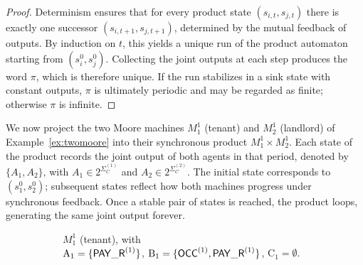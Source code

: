 \documentclass{article}
\begin{document}
  \begin{proof}
  Determinism ensures that for every product state $(s_{i,t},s_{j,t})$ there is exactly one
  successor $(s_{i,t+1},s_{j,t+1})$, determined by the mutual feedback of outputs.
  By induction on $t$, this yields a unique run of the product automaton starting from $(s^0_i,s^0_j)$.
  Collecting the joint outputs at each step produces the word $\pi$, which is therefore unique.
  If the run stabilizes in a sink state with constant outputs, $\pi$ is ultimately periodic
  and may be regarded as finite; otherwise $\pi$ is infinite.
  \end{proof}
  
  \begin{example}
  \label{ex:product-automaton}
  We now project the two Moore machines $M_1^1$ (tenant) and $M_2^1$ (landlord) of
  Example~\ref{ex:twomoore} into their synchronous product $M_1^1 \times M_2^1$.
  Each state of the product records the joint output of both agents in that period, denoted by $\{A_1,A_2\}$, with $A_1\in 2^{\Sigma_C^{(1)}}$ and $A_2\in 2^{\Sigma_C^{(2)}}$.
  The initial state corresponds to $(s^0_1,s^0_2)$; subsequent states reflect how both machines
  progress under synchronous feedback. Once a stable pair of states is reached, the product
  loops, generating the same joint output forever.
  
  \begin{figure}[h]
  \centering
  \begin{subfigure}[t]{0.70\textwidth}
  \centering
  \caption{$M_1^1$ (tenant), with\\ $\mathrm{A_1}=\{\mathsf{PAY\_R}^{(1)}\}$, $\mathrm{B_1}=\{\mathsf{OCC}^{(1)},\mathsf{PAY\_R}^{(1)}\}$, $\mathrm{C_1}=\emptyset$.}
  \label{fig:moore-tenant-prod}
  \end{subfigure}
  \vspace{0.5cm}
  \begin{subfigure}[t]{0.70\textwidth}
  \centering
\end{subfigure}
\end{figure}
\end{example}
\end{document}
